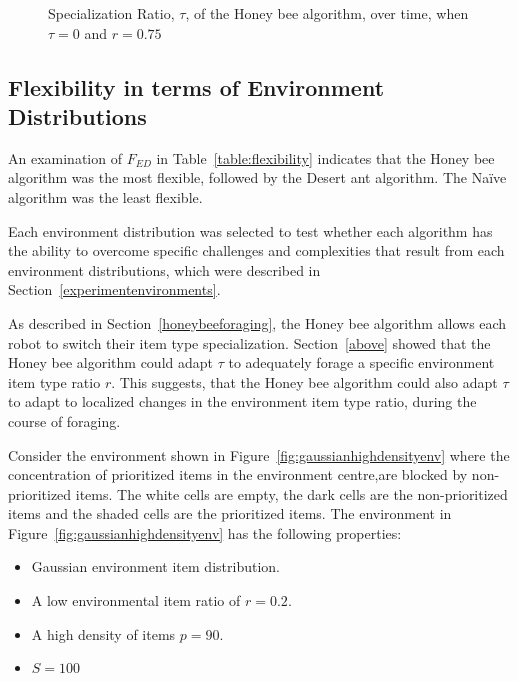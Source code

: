 
\begin{figure}[!htb]
\centering
\resizebox{\textwidth}{!}{}
\caption{Specialization Ratio, $\tau$, of the Honey bee algorithm, over time, when $\tau=0$ and $r=0.75$}
\label{fig:specializationratioovertime}
\end{figure}


\subsection{Flexibility in terms of Environment Distributions}
\label{results:flexibility:environmentdistribution}

An examination of $F_{ED}$ in Table~\ref{table:flexibility} indicates that the Honey bee algorithm was the most flexible, followed by the Desert ant algorithm. The Na\"ive algorithm was the least flexible.

Each environment distribution was selected to test whether each algorithm has the ability to overcome specific challenges and complexities that result from each environment distributions, which were described in Section~\ref{experimentenvironments}.

As described in Section~\ref{honeybeeforaging}, the Honey bee algorithm allows each robot to switch their item type specialization. Section~\ref{above} showed that the Honey bee algorithm could adapt $\tau$ to adequately forage a specific environment item type ratio $r$. This suggests, that the Honey bee algorithm could also adapt $\tau$ to adapt to localized changes in the environment item type ratio, during the course of foraging. 

Consider the environment shown in Figure~\ref{fig:gaussianhighdensityenv} where the concentration of prioritized items in the environment centre,are blocked by non-prioritized items. The white cells are empty, the dark cells are the non-prioritized items and the shaded cells are the prioritized items. The environment in Figure~\ref{fig:gaussianhighdensityenv} has the following properties:

\begin{itemize}
\item Gaussian environment item distribution.
\item A low environmental item ratio of $r=0.2$.
\item A high density of items $p=90$.
\item $S=100$
\end{itemize}

